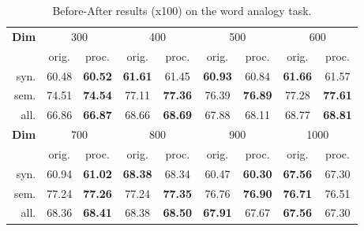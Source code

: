\documentclass{article} \usepackage{acl2017,times}
\begin{document}
\begin{table}[!h]
\centering
\begin{tabular}{|r|c|c|c|c|c|c|c|c|}
\hline
\multirow{2}{*}{\bf Dim} & \multicolumn{2}{c|}{300} & \multicolumn{2}{c|}{400}        & \multicolumn{2}{c|}{500}        & \multicolumn{2}{c|}{600}        \\ \cline{2-9} 
                         & orig.  & proc.           & orig.          & proc.          & orig.          & proc.          & orig.          & proc.          \\ \hline
syn.                     & 60.48  & \textbf{60.52}  & \textbf{61.61} & 61.45          & \textbf{60.93} & 60.84          & \textbf{61.66} & 61.57          \\ \hline
sem.                     & 74.51  & \textbf{74.54}  & 77.11          & \textbf{77.36} & 76.39          & \textbf{76.89} & 77.28          & \textbf{77.61} \\ \hline
all.                     & 66.86  & \textbf{66.87}  & 68.66          & \textbf{68.69} & 67.88          & 68.11          & 68.77          & \textbf{68.81} \\ \hline
\multirow{2}{*}{\bf Dim} & \multicolumn{2}{c|}{700} & \multicolumn{2}{c|}{800}        & \multicolumn{2}{c|}{900}        & \multicolumn{2}{c|}{1000}       \\ \cline{2-9} 
                         & orig.  & proc.           & orig.          & proc.          & orig.          & proc.          & orig.          & proc.          \\ \hline
syn.                     & 60.94  & \textbf{61.02}  & \textbf{68.38} & 68.34          & 60.47          & \textbf{60.30} & \textbf{67.56} & 67.30          \\ \hline
sem.                     & 77.24  & \textbf{77.26}  & 77.24          & \textbf{77.35} & 76.76          & \textbf{76.90} & \textbf{76.71} & 76.51          \\ \hline
all.                     & 68.36  & \textbf{68.41}  & 68.38          & \textbf{68.50} & \textbf{67.91} & 67.67          & \textbf{67.56} & 67.30          \\ \hline
\end{tabular}
\caption{Before-After results (x100) on the word analogy task.}
\label{tb:high-dim-analogy}
\end{table}
\end{document}
